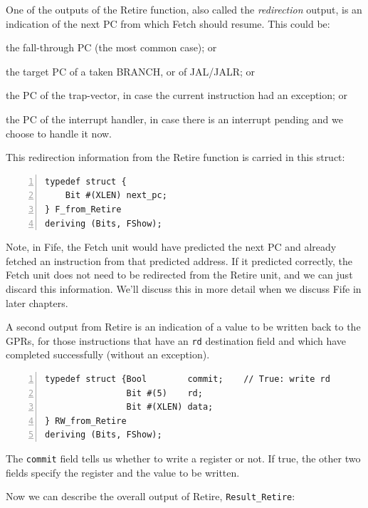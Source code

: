 One of the outputs of the Retire function, also called the
\emph{redirection} output, is an indication of the next PC from which
Fetch should resume.  This could be:

\begin{tightlist}

  \item the fall-through PC (the most common case); or

  \item the target PC of a taken BRANCH, or of JAL/JALR; or

  \item the PC of the trap-vector, in case the current instruction had
    an exception; or

  \item the PC of the interrupt handler, in case there is an
    interrupt pending and we choose to handle it now.
\end{tightlist}

This redirection information from the Retire function is carried in
this struct:

{\small
\begin{Verbatim}[frame=single, numbers=left]
typedef struct {
    Bit #(XLEN) next_pc;
} F_from_Retire
deriving (Bits, FShow);
\end{Verbatim}
}

Note, in Fife, the Fetch unit would have predicted the next PC and
already fetched an instruction from that predicted address.  If it
predicted correctly, the Fetch unit does not need to be redirected
from the Retire unit, and we can just discard this information.  We'll
discuss this in more detail when we discuss Fife in later chapters.

A second output from Retire is an indication of a value to be written
back to the GPRs, for those instructions that have an \verb|rd|
destination field and which have completed successfully (without an
exception).

{\small
\begin{Verbatim}[frame=single, numbers=left]
typedef struct {Bool        commit;    // True: write rd
                Bit #(5)    rd;
                Bit #(XLEN) data;
} RW_from_Retire
deriving (Bits, FShow);
\end{Verbatim}
}

The \verb|commit| field tells us whether to write a register or not.
If true, the other two fields specify the register and the value to be
written.

Now we can describe the overall output of Retire, \verb|Result_Retire|:

